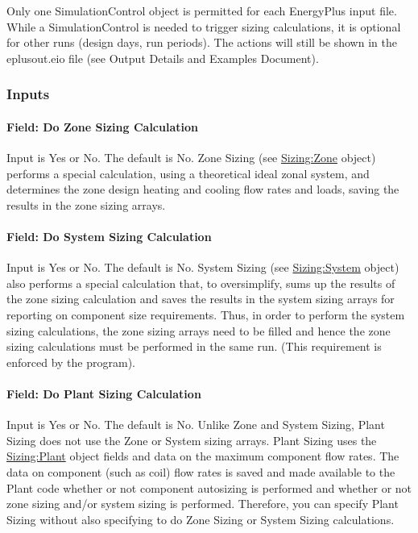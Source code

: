 \begin{callout}
Only one SimulationControl object is permitted for each EnergyPlus input file. While a SimulationControl is needed to trigger sizing calculations, it is optional for other runs (design days, run periods). The actions will still be shown in the eplusout.eio file (see Output Details and Examples Document).
\end{callout}

\subsubsection{Inputs}\label{inputs-15-014}

\paragraph{Field: Do Zone Sizing Calculation}\label{field-do-zone-sizing-calculation}

Input is Yes or No. The default is No. Zone Sizing (see \hyperref[sizingzone]{Sizing:Zone} object) performs a special calculation, using a theoretical ideal zonal system, and determines the zone design heating and cooling flow rates and loads, saving the results in the zone sizing arrays.

\paragraph{Field: Do System Sizing Calculation}\label{field-do-system-sizing-calculation}

Input is Yes or No. The default is No. System Sizing (see \hyperref[sizingsystem]{Sizing:System} object) also performs a special calculation that, to oversimplify, sums up the results of the zone sizing calculation and saves the results in the system sizing arrays for reporting on component size requirements. Thus, in order to perform the system sizing calculations, the zone sizing arrays need to be filled and hence the zone sizing calculations must be performed in the same run. (This requirement is enforced by the program).

\paragraph{Field: Do Plant Sizing Calculation}\label{field-do-plant-sizing-calculation}

Input is Yes or No. The default is No. Unlike Zone and System Sizing, Plant Sizing does not use the Zone or System sizing arrays. Plant Sizing uses the \hyperref[sizingplant]{Sizing:Plant} object fields and data on the maximum component flow rates. The data on component (such as coil) flow rates is saved and made available to the Plant code whether or not component autosizing is performed and whether or not zone sizing and/or system sizing is performed. Therefore, you can specify Plant Sizing without also specifying to do Zone Sizing or System Sizing calculations.

